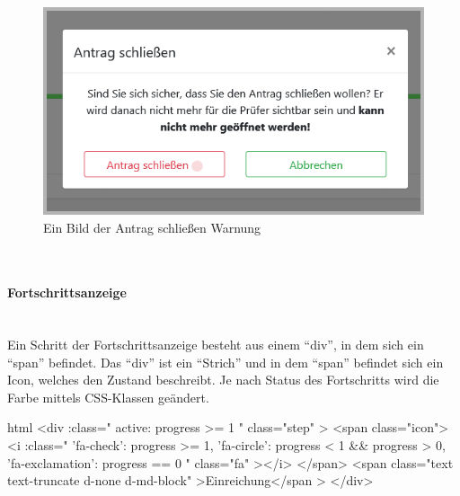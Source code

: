 \begin{figure}[H]
	\centering
	\includegraphics[width=0.6\linewidth]{images/website/antrag_schliessen}
	\caption[Antrag schließen Warnung]{Ein Bild der Antrag schließen Warnung}
	\label{fig:antragaktivdetail}
\end{figure}

~\\
\paragraph{Fortschrittsanzeige}
~\\
Ein Schritt der Fortschrittsanzeige besteht aus einem \enquote{div}, in dem sich ein \enquote{span} befindet. Das \enquote{div} ist ein \enquote{Strich} und in dem \enquote{span} befindet sich ein Icon, welches den Zustand beschreibt. Je nach Status des Fortschritts wird die Farbe mittels CSS-Klassen geändert.
\begin{code}{html}
	<div
            :class="{
              active: progress >= 1
            }"
            class="step"
          >
            <span class="icon">
              <i
                :class="{
                  'fa-check': progress >= 1,
                  'fa-circle': progress < 1 && progress > 0,
                  'fa-exclamation': progress == 0
                }"
                class="fa"
              ></i>
            </span>
            <span class="text text-truncate d-none d-md-block"
              >Einreichung</span
            >
          </div>
\end{code}
	\label{list:codeprogress} ~\\

	\label{list:progresscolor} ~\\

